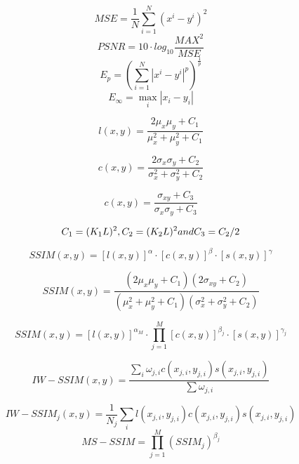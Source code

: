 \begin{equation}
MSE= \frac{1}{N} \sum_{i=1}^N{(x^i-y^i)^2}
\end{equation}
\begin{equation}
PSNR= 10 \cdot log_{10}\frac{MAX^2}{MSE}
\end{equation}
\begin{equation}
E_p = ( \sum_{i=1}^N{|x^i-y^i|^p})^{\frac{1}{p}}
\end{equation}
\begin{equation}
E_\infty = \max_i{|x_i-y_i|}
\end{equation}

\begin{equation}
l(x, y) = \frac{2\mu_x \mu_y + C_1}{\mu_x^2 + \mu_y^2 + C_1}
\end{equation}

\begin{equation}
c(x, y) = \frac{2\sigma_x \sigma_y + C_2}{\sigma_x^2 + \sigma_y^2 + C_2}
\end{equation}

\begin{equation}
c(x, y) = \frac{\sigma_{xy} + C_3}{\sigma_x \sigma_y + C_3}
\end{equation}

\begin{equation}
C_1 = (K_1 L)^2, C_2 = (K_2 L)^2 \space and \space C_3 = C_2/2
\end{equation}

\begin{equation}
SSIM(x, y) = [l(x, y)]^\alpha \cdot[c(x, y)]^\beta \cdot[s(x, y)]^\gamma
\end{equation} 

\begin{equation}
SSIM(x, y) = \frac{(2\mu_x \mu_y + C_1)(2\sigma_{xy} + C_2)}{(\mu_x^2 + \mu_y^2 + C_1)(\sigma_x^2 + \sigma_y^2 + C_2)}
\end{equation} 

\begin{equation}
SSIM(x, y) = [l(x, y)]^{\alpha_M} \cdot\prod_{j=1}^M{[c(x, y)]^{\beta_j} \cdot[s(x, y)]^{\gamma_j}}
\end{equation} 

\begin{equation}
IW-SSIM(x, y) = \frac{\sum_i{\omega_{j,i}c(x_{j,i},y_{j,i})s(x_{j,i},y_{j,i})}}{\sum{\omega_{j,i}}}
\end{equation} 

\begin{equation}
IW-SSIM_j(x, y) = \frac{1}{N_j}\sum_i{l(x_{j,i},y_{j,i})c(x_{j,i},y_{j,i})s(x_{j,i},y_{j,i})}
\end{equation} 
\begin{equation}
MS-SSIM= \prod_{j=1}^M{(SSIM_j)^{\beta_j}}
\end{equation}
